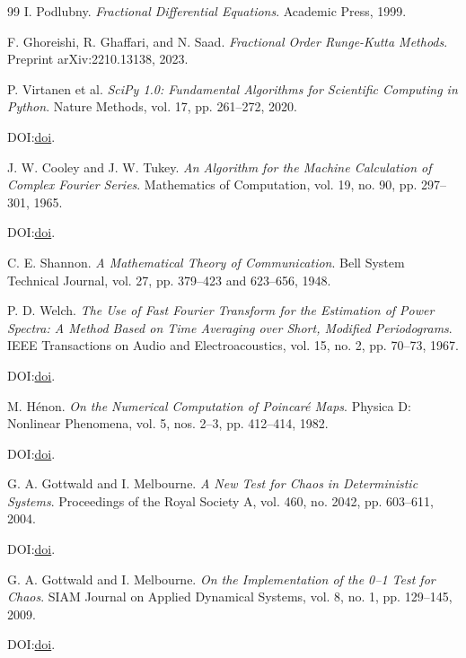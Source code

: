 \documentclass[11pt]{article}
\begin{document}
\begin{thebibliography}{99}
I. Podlubny.
\emph{Fractional Differential Equations}.
Academic Press, 1999.

F. Ghoreishi, R. Ghaffari, and N. Saad.
\emph{Fractional Order Runge-Kutta Methods}.
Preprint \mbox{arXiv:2210.13138}, 2023.

P. Virtanen et al.
\emph{SciPy 1.0: Fundamental Algorithms for Scientific Computing in Python}.
Nature Methods, vol. 17, pp. 261--272, 2020.
\par\noindent DOI:\@ \href{https://doi.org/10.1038/s41592-019-0686-2}{doi}.

J. W. Cooley and J. W. Tukey.
\emph{An Algorithm for the Machine Calculation of Complex Fourier Series}.
Mathematics of Computation, vol. 19, no. 90, pp. 297--301, 1965.
\par\noindent DOI:\@ \href{https://doi.org/10.1090/S0025-5718-1965-0178586-1}{doi}.

C. E. Shannon.
\emph{A Mathematical Theory of Communication}.
Bell System Technical Journal, vol. 27, pp. 379--423 and 623--656, 1948.

P. D. Welch.
\emph{The Use of Fast Fourier Transform for the Estimation of Power Spectra:
A Method Based on Time Averaging over Short, Modified Periodograms}.
IEEE Transactions on Audio and Electroacoustics, vol. 15, no. 2,
pp. 70--73, 1967.
\par\noindent DOI:\@ \href{https://doi.org/10.1109/TAU.1967.1161901}{doi}.

M. Hénon.
\emph{On the Numerical Computation of Poincaré Maps}.
Physica D: Nonlinear Phenomena, vol. 5, nos. 2--3, pp. 412--414, 1982.
\par\noindent DOI:\@ \href{https://doi.org/10.1016/0167-2789(82)90034-3}{doi}.

G. A. Gottwald and I. Melbourne.
\emph{A New Test for Chaos in Deterministic Systems}.
Proceedings of the Royal Society A, vol. 460, no. 2042,
pp. 603--611, 2004.
\par\noindent DOI:\@ \href{https://doi.org/10.1098/rspa.2003.1183}{doi}.

G. A. Gottwald and I. Melbourne.
\emph{On the Implementation of the 0--1 Test for Chaos}.
SIAM Journal on Applied Dynamical Systems, vol. 8, no. 1,
pp. 129--145, 2009.
\par\noindent DOI:\@ \href{https://doi.org/10.1137/080718851}{doi}.


\end{thebibliography}
\end{document}

